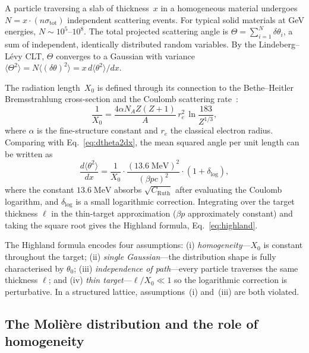 \documentclass[final,5p,times,twocolumn]{elsarticle}
\begin{document}
A particle traversing a slab of thickness~$x$ in a homogeneous material undergoes $N = x\cdot(n\sigma_{\mathrm{tot}})$ independent scattering events.  For typical solid materials at GeV energies, $N\sim 10^5$--$10^8$.  The total projected scattering angle is $\Theta = \sum_{i=1}^N \delta\theta_i$, a sum of independent, identically distributed random variables.  By the Lindeberg--L\'evy CLT, $\Theta$ converges to a Gaussian with variance $\langle\Theta^2\rangle = N\langle(\delta\theta)^2\rangle = x\,d\langle\theta^2\rangle/dx$.

The radiation length~$X_0$ is defined through its connection to the Bethe--Heitler Bremsstrahlung cross-section and the Coulomb scattering rate~\cite{PDG2024}:
\begin{equation}
  \frac{1}{X_0} = \frac{4\alpha N_A Z(Z+1)}{A}\,r_e^2\,\ln\frac{183}{Z^{1/3}},
  \label{eq:X0}
\end{equation}
where $\alpha$ is the fine-structure constant and $r_e$ the classical electron radius.  Comparing with Eq.~\eqref{eq:dtheta2dx}, the mean squared angle per unit length can be written as
\begin{equation}
  \frac{d\langle\theta^2\rangle}{dx} = \frac{1}{X_0}\cdot\frac{(13.6\;\text{MeV})^2}{(\beta pc)^2}\cdot(1+\delta_{\log}),
  \label{eq:dtheta2dx_X0}
\end{equation}
where the constant $13.6\;\text{MeV}$ absorbs $\sqrt{C_{\mathrm{Ruth}}}$ after evaluating the Coulomb logarithm, and $\delta_{\log}$ is a small logarithmic correction.  Integrating over the target thickness $\ell$ in the thin-target approximation ($\beta p$ approximately constant) and taking the square root gives the Highland formula, Eq.~\eqref{eq:highland}.

The Highland formula encodes four assumptions: (i) \emph{homogeneity}---$X_0$ is constant throughout the target; (ii) \emph{single Gaussian}---the distribution shape is fully characterised by $\theta_0$; (iii) \emph{independence of path}---every particle traverses the same thickness $\ell$; and (iv) \emph{thin target}---$\ell/X_0\ll 1$ so the logarithmic correction is perturbative.  In a structured lattice, assumptions~(i) and~(iii) are both violated.

\subsection{The Moli\`{e}re distribution and the role of homogeneity}
\label{sec:moliere}
\end{document}
